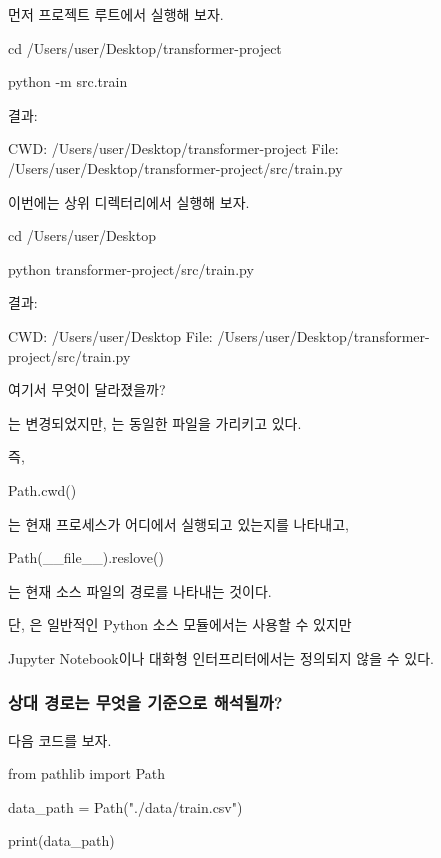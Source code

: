먼저 프로젝트 루트에서 실행해 보자.

\begin{dhkzsh}
cd /Users/user/Desktop/transformer-project

python -m src.train
\end{dhkzsh}

결과:

\begin{dhkzsh}
CWD: /Users/user/Desktop/transformer-project
File: /Users/user/Desktop/transformer-project/src/train.py
\end{dhkzsh}

이번에는 상위 디렉터리에서 실행해 보자.

\begin{dhkzsh}
cd /Users/user/Desktop

python transformer-project/src/train.py
\end{dhkzsh}

결과:

\begin{dhkzsh}
CWD: /Users/user/Desktop
File: /Users/user/Desktop/transformer-project/src/train.py
\end{dhkzsh}

여기서 무엇이 달라졌을까?

는 변경되었지만, 는 동일한 파일을 가리키고 있다.

즉,

\begin{dhkcode}
Path.cwd()
\end{dhkcode}

는 현재 프로세스가 어디에서 실행되고 있는지를 나타내고,

\begin{dhkcode}
Path(__file__).reslove()
\end{dhkcode}

는 현재 소스 파일의 경로를 나타내는 것이다.

단, 은 일반적인 Python 소스 모듈에서는 사용할 수 있지만

Jupyter Notebook이나 대화형 인터프리터에서는 정의되지 않을 수 있다.

\subsubsection{상대 경로는 무엇을 기준으로 해석될까?}

다음 코드를 보자.

\begin{dhkcode}
from pathlib import Path

data_path = Path("./data/train.csv")

print(data_path)
\end{dhkcode}

